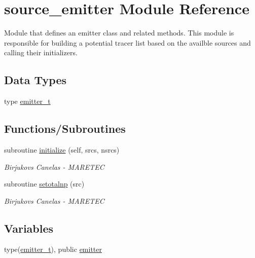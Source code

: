 \hypertarget{namespacesource__emitter}{}\section{source\+\_\+emitter Module Reference}
\label{namespacesource__emitter}


Module that defines an emitter class and related methods. This module is responsible for building a potential tracer list based on the availble sources and calling their initializers.  


\subsection*{Data Types}
\begin{DoxyCompactItemize}
\item 
type \mbox{\hyperlink{structsource__emitter_1_1emitter__t}{emitter\+\_\+t}}
\end{DoxyCompactItemize}
\subsection*{Functions/\+Subroutines}
\begin{DoxyCompactItemize}
\item 
subroutine \mbox{\hyperlink{namespacesource__emitter_a18e5a215687e0f5f13c0148be0f0c0e6}{initialize}} (self, srcs, nsrcs)
\begin{DoxyCompactList}\small\item\em Birjukovs Canelas -\/ M\+A\+R\+E\+T\+EC \end{DoxyCompactList}\item 
subroutine \mbox{\hyperlink{namespacesource__emitter_a73d054a39fc1fccfde74173a5c7f2c58}{setotalnp}} (src)
\begin{DoxyCompactList}\small\item\em Birjukovs Canelas -\/ M\+A\+R\+E\+T\+EC \end{DoxyCompactList}\end{DoxyCompactItemize}
\subsection*{Variables}
\begin{DoxyCompactItemize}
\item 
type(\mbox{\hyperlink{structsource__emitter_1_1emitter__t}{emitter\+\_\+t}}), public \mbox{\hyperlink{namespacesource__emitter_a357876a84a74e23c44e92ab8ef7dc35e}{emitter}}
\end{DoxyCompactItemize}


